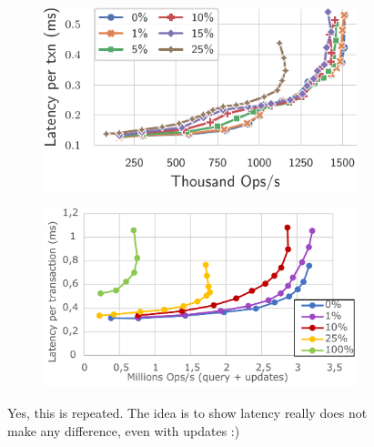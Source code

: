 \documentclass[sigplan,10pt]{acmart}
\begin{document}
\begin{figure}[h]
	\centering
	\begin{subfigure}{.47\linewidth}
		\includegraphics[width=1\linewidth]{singleQuery/upd_rate_global_noTC}
		\caption{}
		\label{fig:(new)(repeat)update_rates}
	\end{subfigure}%
	\hspace*{3em}
	\begin{subfigure}{.47\linewidth}
		\includegraphics[width=1\linewidth]{updRate_global_cut}
		\caption{}
		\label{fig:(old)(repeat)update_rates}
	\end{subfigure}
	\caption{Yes, this is repeated. The idea is to show latency really does not make any difference, even with updates :)}
\end{figure}
\end{document}
